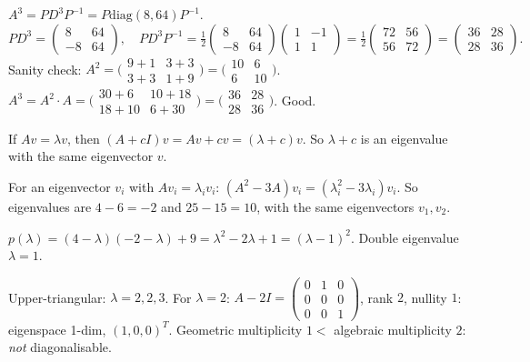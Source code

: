 \begin{solutions}
  \item $A^{3} = P D^{3} P^{-1} = P \mathrm{diag}(8, 64) P^{-1}$.
  \[
  P D^{3} = \begin{pmatrix} 8 & 64 \\ -8 & 64 \end{pmatrix}, \quad P D^{3} P^{-1} = \tfrac{1}{2}\begin{pmatrix} 8 & 64 \\ -8 & 64 \end{pmatrix}\begin{pmatrix} 1 & -1 \\ 1 & 1 \end{pmatrix} = \tfrac{1}{2}\begin{pmatrix} 72 & 56 \\ 56 & 72 \end{pmatrix} = \begin{pmatrix} 36 & 28 \\ 28 & 36 \end{pmatrix}.
  \]
  Sanity check: $A^{2} = \bigl(\begin{smallmatrix} 9 + 1 & 3 + 3 \\ 3 + 3 & 1 + 9 \end{smallmatrix}\bigr) = \bigl(\begin{smallmatrix} 10 & 6 \\ 6 & 10 \end{smallmatrix}\bigr)$. $A^{3} = A^{2} \cdot A = \bigl(\begin{smallmatrix} 30 + 6 & 10 + 18 \\ 18 + 10 & 6 + 30 \end{smallmatrix}\bigr) = \bigl(\begin{smallmatrix} 36 & 28 \\ 28 & 36 \end{smallmatrix}\bigr)$. Good.
  \item If $A v = \lambda v$, then $(A + c I) v = A v + c v = (\lambda + c) v$. So $\lambda + c$ is an eigenvalue with the same eigenvector $v$.
  \item For an eigenvector $v_{i}$ with $A v_{i} = \lambda_{i} v_{i}$: $(A^{2} - 3 A) v_{i} = (\lambda_{i}^{2} - 3 \lambda_{i}) v_{i}$. So eigenvalues are $4 - 6 = -2$ and $25 - 15 = 10$, with the same eigenvectors $v_{1}, v_{2}$.
  \item $p(\lambda) = (4 - \lambda)(-2 - \lambda) + 9 = \lambda^{2} - 2 \lambda + 1 = (\lambda - 1)^{2}$. Double eigenvalue $\lambda = 1$.
  \item Upper-triangular: $\lambda = 2, 2, 3$. For $\lambda = 2$: $A - 2 I = \begin{pmatrix} 0 & 1 & 0 \\ 0 & 0 & 0 \\ 0 & 0 & 1 \end{pmatrix}$, rank $2$, nullity $1$: eigenspace 1-dim, $(1, 0, 0)^{T}$. Geometric multiplicity $1 <$ algebraic multiplicity $2$: \emph{not} diagonalisable.

\end{solutions}
